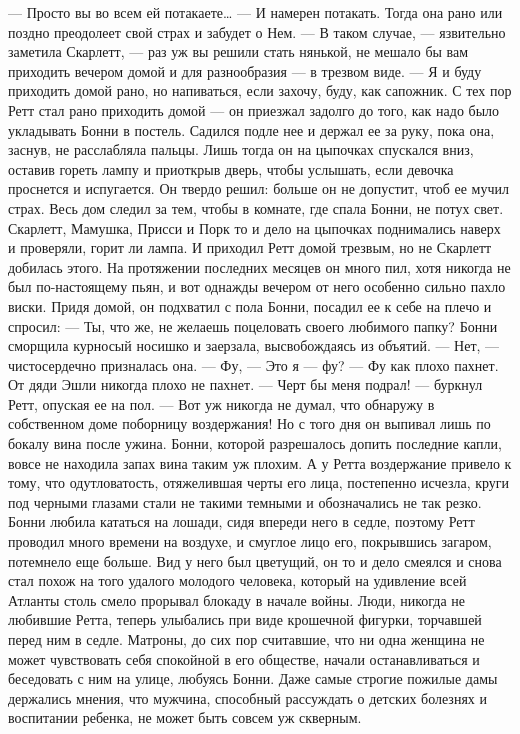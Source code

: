 — Просто вы во всем ей потакаете…
— И намерен потакать. Тогда она рано или поздно преодолеет свой страх и забудет о Нем. — В таком случае, — язвительно заметила Скарлетт, — раз уж вы решили стать нянькой, не мешало бы вам приходить вечером домой и для разнообразия — в трезвом виде.
— Я и буду приходить домой рано, но напиваться, если захочу, буду, как сапожник.
С тех пор Ретт стал рано приходить домой — он приезжал задолго до того, как надо было укладывать Бонни в постель. Садился подле нее и держал ее за руку, пока она, заснув, не расслабляла пальцы. Лишь тогда он на цыпочках спускался вниз, оставив гореть лампу и приоткрыв дверь, чтобы услышать, если девочка проснется и испугается. Он твердо решил: больше он не допустит, чтоб ее мучил страх. Весь дом следил за тем, чтобы в комнате, где спала Бонни, не потух свет. Скарлетт, Мамушка, Присси и Порк то и дело на цыпочках поднимались наверх и проверяли, горит ли лампа.
И приходил Ретт домой трезвым, но не Скарлетт добилась этого. На протяжении последних месяцев он много пил, хотя никогда не был по-настоящему пьян, и вот однажды вечером от него особенно сильно пахло виски. Придя домой, он подхватил с пола Бонни, посадил ее к себе на плечо и спросил:
— Ты, что же, не желаешь поцеловать своего любимого папку? Бонни сморщила курносый носишко и заерзала, высвобождаясь из объятий.
— Нет, — чистосердечно призналась она. — Фу, — Это я — фу?
— Фу как плохо пахнет. От дяди Эшли никогда плохо не пахнет.
— Черт бы меня подрал! — буркнул Ретт, опуская ее на пол. — Вот уж никогда не думал, что обнаружу в собственном доме поборницу воздержания!
Но с того дня он выпивал лишь по бокалу вина после ужина. Бонни, которой разрешалось допить последние капли, вовсе не находила запах вина таким уж плохим. А у Ретта воздержание привело к тому, что одутловатость, отяжелившая черты его лица, постепенно исчезла, круги под черными глазами стали не такими темными и обозначались не так резко. Бонни любила кататься на лошади, сидя впереди него в седле, поэтому Ретт проводил много времени на воздухе, и смуглое лицо его, покрывшись загаром, потемнело еще больше. Вид у него был цветущий, он то и дело смеялся и снова стал похож на того удалого молодого человека, который на удивление всей Атланты столь смело прорывал блокаду в начале войны.
Люди, никогда не любившие Ретта, теперь улыбались при виде крошечной фигурки, торчавшей перед ним в седле. Матроны, до сих пор считавшие, что ни одна женщина не может чувствовать себя спокойной в его обществе, начали останавливаться и беседовать с ним на улице, любуясь Бонни. Даже самые строгие пожилые дамы держались мнения, что мужчина, способный рассуждать о детских болезнях и воспитании ребенка, не может быть совсем уж скверным.

